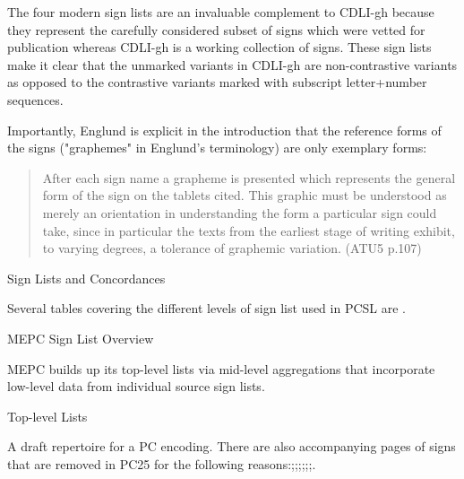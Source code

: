 \par The four modern sign lists are an invaluable complement to
      CDLI-gh because they represent the carefully considered subset
      of signs which were vetted for publication whereas CDLI-gh is a
      working collection of signs.  These sign lists make it clear
      that the unmarked variants in CDLI-gh are non-contrastive
      variants as opposed to the contrastive variants marked with
      subscript letter+number sequences.


\par Importantly, Englund is explicit in the introduction that the
      reference forms of the signs ("graphemes" in Englund's
      terminology) are only exemplary forms:

\begin{quote}After each sign name a grapheme is presented which
      represents the general form of the sign on the tablets
      cited. This graphic must be understood as merely an orientation
      in understanding the form a particular sign could take, since in
      particular the texts from the earliest stage of writing exhibit,
      to varying degrees, a tolerance of graphemic variation.  (ATU5
      p.107)
\end{quote}
\Hhhh{}Sign Lists and Concordances


\par Several tables covering the different levels of sign list
      used in PCSL are .

\Hh{}MEPC Sign List Overview


\par MEPC builds up its top-level lists via mid-level aggregations
    that incorporate low-level data from individual source sign
    lists.

\Hhh{}Top-level Lists

\Hdl\Hdt{}

{}A draft repertoire for a PC encoding. There are also
      accompanying pages of signs that are removed in PC25 for the
      following reasons:;;;;;;.

